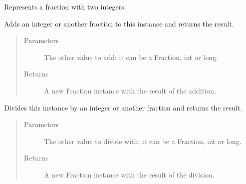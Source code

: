 \documentclass[letterpaper,10pt,english]{sphinxmanual}
\begin{document}
\begin{fulllineitems}
\label{\detokenize{fraction:fraction.Fraction}}
Represents a fraction with two integers.

\begin{fulllineitems}
\label{\detokenize{fraction:fraction.Fraction.__add__}}
Adds an integer or another fraction to this instance and returns the result.
\begin{quote}\begin{description}
\item[{Parameters}] \leavevmode
{} \textendash{} The other value to add; it can be a Fraction, int or long.

\item[{Returns}] \leavevmode
A new Fraction instance with the result of the addition.

\end{description}\end{quote}

\end{fulllineitems}


\begin{fulllineitems}
\label{\detokenize{fraction:fraction.Fraction.__div__}}
Divides this instance by an integer or another fraction and returns the result.
\begin{quote}\begin{description}
\item[{Parameters}] \leavevmode
{} \textendash{} The other value to divide with; it can be a Fraction, int or long.

\item[{Returns}] \leavevmode
A new Fraction instance with the result of the division.

\end{description}\end{quote}

\end{fulllineitems}



\end{fulllineitems}
\end{document}
